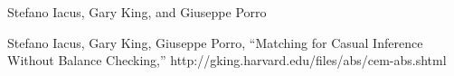 \begin{Author}\relax
Stefano Iacus, Gary King, and Giuseppe Porro
\end{Author}
\begin{References}\relax
Stefano Iacus, Gary King, Giuseppe Porro, ``Matching for
Casual Inference Without Balance Checking,''
http://gking.harvard.edu/files/abs/cem-abs.shtml
\end{References}
\begin{Examples}
\end{Examples}

